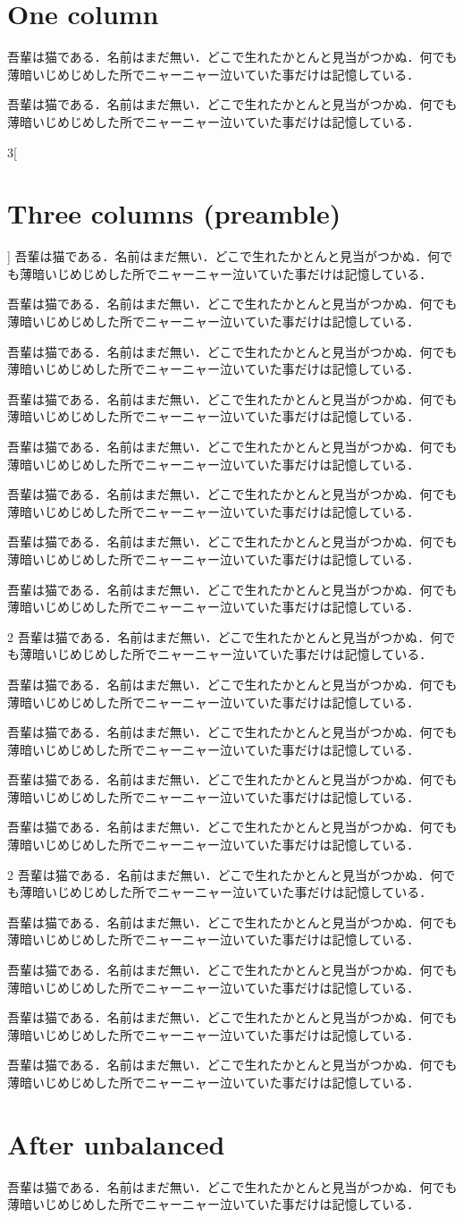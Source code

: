 \documentclass[fontsize=10pt,twocolumn]{jlreq}
\newcommand\para{吾輩は猫である．名前はまだ無い．どこで生れたかとんと見当がつかぬ．何でも薄暗いじめじめした所でニャーニャー泣いていた事だけは記憶している．\par}
\begin{document}
\section{One column}
\para\para
\begin{multicols}{3}[\section{Three columns (preamble)}]
\para\para\para\para\para\para\para
\end{multicols}
\para
\begin{multicols}{2}
\para\para\para
\columnbreak
\para
\end{multicols}
\para
\begin{multicols*}{2}
\para\para\para\para\para
\end{multicols*}
\section{After unbalanced}
\para
\end{document}
